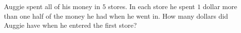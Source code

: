 Auggie spent all of his money in $5$ stores. In each store he spent $1$ dollar more than one half of the money he had when he went in. How many dollars did Auggie have when he entered the first store?
